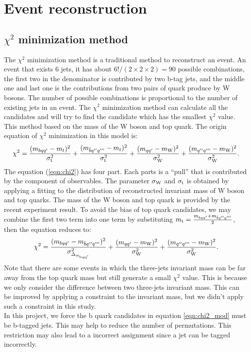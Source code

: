 \section{Event reconstruction}\label{sec:Event reconstruction}
\subsection{$\chi^{2}$ minimization method}\label{subsec:chi-square}
The $\chi^{2}$ minimization method is a traditional method to reconstruct an event. An event that exists 6 jets, it has about $6!/(2\times2\times2)=90$ possible combinations, the first two in the denominator is contributed by two b-tag jets, and the middle one and last one is the contributions from two pairs of quark produce by W bosons. The number of possible combinations is proportional to the number of existing jets in an event. The $\chi^{2}$ minimization method can calculate all the candidates and will try to find the candidate which has the smallest $\chi^{2}$ value. This method based on the mass of the W boson and top quark. The origin equation of $\chi^{2}$ minimization in this model is:
\begin{equation}\label{eqn:chi2}
	\chi^{2} = \frac{( m_{bqq'} - m_{t} )^{2}}{\sigma_{\rm t}^{2}} + \frac{( m_{\bar{b}q''q'''} - m_{t} )^{2}}{\sigma_{\rm t}^{2}} + \frac{(m_{qq'} - m_{\rm W})^{2}}{\sigma^{2}_{\rm W}} + \frac{(m _{q''q'''} - m_{\rm W})^{2}}{\sigma^{2}_{\rm W}}.
\end{equation} 
The equation (\ref{eqn:chi2}) has four part. Each parts is a ``pull'' that is contributed by the component of observables. The parameter $\sigma_{\rm W}$ and $\sigma_{\rm t}$ is obtained by applying a fitting to the distribution of reconstructed invariant mass of W boson and top quarks. The mass of the W boson and top quark is provided by the recent experiment result. To avoid the bias of top quark candidates, we may combine the first two term into one term by substituting $m_{\rm t}=\frac{m_{bqq'} + m_{\bar{b}q''q'''}}{2}$, then the equation reduces to: 
\begin{equation}\label{eqn:chi2_mod}
	\chi^{2} = \frac{(m_{bqq'} - m_{\bar{b}q''q'''})^{2}}{\sigma^{2}_{\Delta_{\rm m_{bqq'}}}}  + \frac{(m_{qq'} - m_{\rm W})^{2}}{\sigma^{2}_{\rm W}} + \frac{(m _{q''q'''} - m_{\rm W})^{2}}{\sigma^{2}_{\rm W}}.
\end{equation} 
Note that there are some events in which the three-jets invariant mass can be far away from the top quark mass but still generate a small $\chi^{2}$ value. This is because we only consider the difference between two three-jets invariant mass. This can be improved by applying a constraint to the invariant mass\cite{Mccarthy:2015ucy}, but we didn't apply such a constraint in this study. 
\\
In this project, we force the b quark candidates in equation \ref{eqn:chi2_mod} must be b-tagged jets. This may help to reduce the number of permutations. This restriction may also lead to a incorrect assignment since a jet can be tagged incorrectly.
